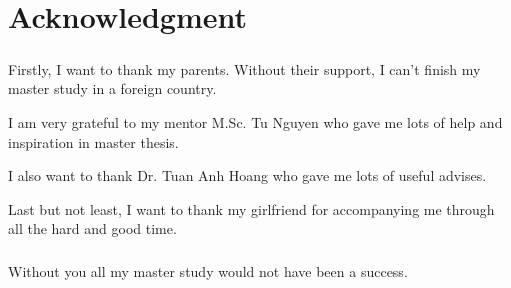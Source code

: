 \chapter{Acknowledgment}

\paragraph{} %
\label{par:}
 
Firstly, I want to thank my parents. Without their support, I can't finish my master study in a foreign country. 
 
I am very grateful to my mentor M.Sc. Tu Nguyen who gave me lots of help and inspiration in master thesis.

I also want to thank Dr. Tuan Anh Hoang who gave me lots of useful advises.

Last but not least, I want to thank my girlfriend for accompanying me through all the hard and good time.
\paragraph{}

Without you all my master study would not have been a success. 



\paragraph{}


